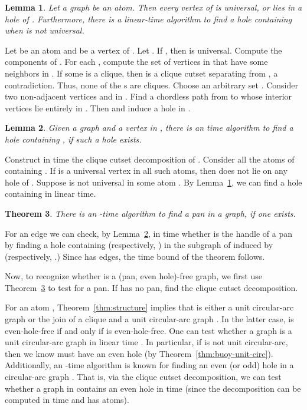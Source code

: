 \documentclass[11pt,a4paper]{article}
\newtheorem{theorem} {Theorem}[section]
\newtheorem{lemma}[theorem]{Lemma}
\newenvironment{proof}{\noindent {\it Proof:~}}{\hfill \smallskip\par}
\begin{document}
\begin{lemma}\label{lem:hole-in-atom}
Let a graph  be an atom. Then every vertex  of  is
universal, or lies in a hole of . Furthermore, there is a
linear-time algorithm to find a hole containing  when  is
not universal.
\end{lemma}
\begin{proof}
Let  be an atom and  be a vertex of . Let . If , then  is universal.
Compute the components  of . For each
, compute the set  of vertices in  that have some
neighbors in . If some  is a clique, then  is a
clique cutset separating  from , a contradiction. Thus,
none of the s are cliques. Choose an arbitrary set
. Consider two non-adjacent vertices  and  in . Find a
chordless path  from  to  whose interior vertices lie
entirely in . Then  and  induce a hole in .
\end{proof}
\begin{lemma}\label{lem:find-hole}
Given a graph  and a vertex  in , there is an 
time algorithm to find a hole containing , if such a hole
exists.
\end{lemma}
\begin{proof}
Construct in  time the clique cutset decomposition 
of . Consider all the atoms of  containing . If  is a universal
vertex in all such atoms, then  does not lie on any hole of .
Suppose  is not universal in some atom . By
Lemma~\ref{lem:hole-in-atom}, we can find a hole
containing  in linear time.
\end{proof}
\begin{theorem}\label{thm:find-pan}
There is an -time algorithm to find a pan in a graph, if
one exists.
\end{theorem}
\begin{proof}
For an edge  we can check, by Lemma~\ref{lem:find-hole}, in
 time whether  is the handle of a pan by finding a
hole containing  (respectively, ) in the subgraph of 
induced by  (respectively, .) Since  has  edges, the time bound of the theorem
follows.
\end{proof}





Now, to recognize whether  is a (pan, even hole)-free graph, we
first use Theorem~\ref{thm:find-pan} to test for a pan. If  has
no pan, find the clique cutset decomposition.

For an atom , Theorem~\ref{thm:structure} implies that  is
either a unit circular-arc graph or the join of a clique  and a
unit circular-arc graph . In the latter case,   is
even-hole-free if and only if  is even-hole-free. One can test
whether a graph is a unit circular-arc graph in linear time
\cite{LS2008}. In particular, if  is not unit circular-arc,
then we know  must have an even hole (by
Theorem~\ref{thm:buoy-unit-circ}). Additionally, an -time algorithm is known for finding an even (or odd) hole
in a circular-arc graph \cite{CamEsc2007}. That is, via the clique
cutset decomposition, we can test whether a graph in 
contains an even hole in  time (since the
decomposition can be computed in  time and has 
atoms).
\end{document}
